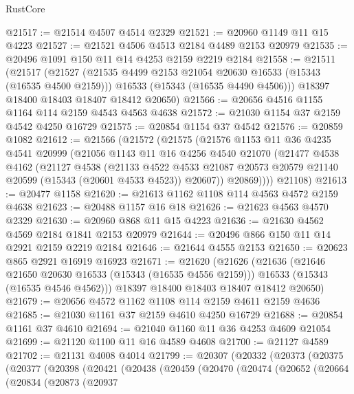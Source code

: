 \begin{lexlean}{RustCore}
\begin{coremodule}
@21517 := @21514 @4507 @4514 @2329
@21521 := @20960 @1149 @11 @15 @4223
@21527 := @21521 @4506 @4513 @2184 @4489 @2153 @20979
@21535 := @20496 @1091 @150 @11 @14 @4253 @2159 @2219 @2184
@21558 := @21511
    (@21517
      (@21527
        (@21535 @4499 @2153 @21054 @20630 @16533 (@15343 (@16535 @4500 @2159)))
        @16533
        (@15343 (@16535 @4490 @4506)))
      @18397
      @18400
      @18403
      @18407
      @18412
      @20650)
@21566 := @20656 @4516 @1155 @1164 @114 @2159 @4543 @4563 @4638
@21572 := @21030 @1154 @37 @2159 @4542 @4250 @16729
@21575 := @20854 @1154 @37 @4542
@21576 := @20859 @1082
@21612 := @21566
    (@21572
      (@21575
        (@21576
          @1153
          @11
          @36
          @4235
          @4541
          @20999
          (@21056
            @1143
            @11
            @16
            @4256
            @4540
            @21070
            (@21477
              @4538
              @4162
              (@21127
                @4538
                (@21133
                  @4522
                  @4533
                  @21087
                  @20573
                  @20579
                  @21140
                  @20599
                  (@15343 (@20601 @4533 @4523))
                  @20607))
              @20869))))
      @21108)
@21613 := @20477 @1158
@21620 := @21613 @1162 @1108 @114 @4563 @4572 @2159 @4638
@21623 := @20488 @1157 @16 @18
@21626 := @21623 @4563 @4570 @2329
@21630 := @20960 @868 @11 @15 @4223
@21636 := @21630 @4562 @4569 @2184 @1841 @2153 @20979
@21644 := @20496 @866 @150 @11 @14 @2921 @2159 @2219 @2184
@21646 := @21644 @4555 @2153
@21650 := @20623 @865 @2921 @16919 @16923
@21671 := @21620
    (@21626
      (@21636
        (@21646 @21650 @20630 @16533 (@15343 (@16535 @4556 @2159)))
        @16533
        (@15343 (@16535 @4546 @4562)))
      @18397
      @18400
      @18403
      @18407
      @18412
      @20650)
@21679 := @20656 @4572 @1162 @1108 @114 @2159 @4611 @2159 @4636
@21685 := @21030 @1161 @37 @2159 @4610 @4250 @16729
@21688 := @20854 @1161 @37 @4610
@21694 := @21040 @1160 @11 @36 @4253 @4609 @21054
@21699 := @21120 @1100 @11 @16 @4589 @4608
@21700 := @21127 @4589
@21702 := @21131 @4008 @4014
@21799 := @20307
    (@20332
      (@20373
        (@20375
          (@20377
            (@20398
              (@20421
                (@20438
                  (@20459
                    (@20470
                      (@20474
                        (@20652
                          (@20664
                            (@20834
                              (@20873
                                (@20937

\end{coremodule}
\end{lexlean}
